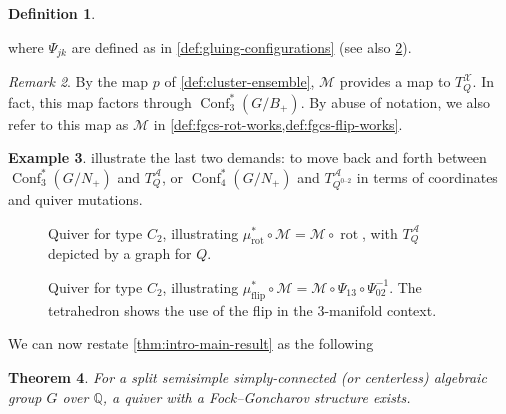 \documentclass{amsart}
\theoremstyle{plain}
\newtheorem{theorem}{Theorem}[section]
\theoremstyle{definition}
\newtheorem{definition}[theorem]{Definition}
\newtheorem{example}[theorem]{Example}
\theoremstyle{remark}
\newtheorem{remark}[theorem]{Remark}
\newcommand{\Qdv}{Q^{0\text{--}2}}
\newcommand{\conftoquiv}{\mathcal{M}}
\newcommand{\muflipind}{{\mu_{\text{flip}}^{\ast}}}
\newcommand{\murotind}{{\mu_{\text{rot}}^{\ast}}}
\newcommand{\seedAtorus}{T^{\mathcal{A}}}
\newcommand{\seedXtorus}{T^{\mathcal{X}}}
\DeclareMathOperator{\Conf}{Conf}
\begin{document}
\begin{definition}
\begin{enumerate}
{      } where $\Psi_{jk}$ are defined as in
      \cref{def:gluing-configurations} (see also
      \cref{fig:QC2-and-flip}).
    \end{enumerate}
  \end{definition}

  \begin{remark}
    By the map $p$ of \cref{def:cluster-ensemble}, $\conftoquiv$
    provides a map to $\seedXtorus_Q$. In fact, this map factors through
    $\Conf_3^{\ast}(G/B_{+})$. By abuse of notation, we also refer to
    this map as $\conftoquiv$ in
    \cref{def:fgcs-rot-works,def:fgcs-flip-works}.
  \end{remark}

  \begin{example}
     illustrate the last two
    demands: to move back and forth between $\Conf_{3}^{\ast}(G/N_{+})$
    and $\seedAtorus_{Q}$, or $\Conf_{4}^{\ast}(G/N_{+})$ and
    $\seedAtorus_{\Qdv}$ in terms of coordinates and quiver mutations.
  \end{example}

  \begin{figure}[h]
    \centering 

    \caption{Quiver for type $C_2$, illustrating $\murotind \circ
      \conftoquiv = \conftoquiv \circ \operatorname{rot}$, with
      $\seedAtorus_Q$ depicted by a graph for $Q$.
      \label{fig:QC2-and-rot}
    }
  \end{figure}

  \begin{figure}[h]
    \centering 

    \caption{Quiver for type $C_2$, illustrating $\muflipind \circ
      \conftoquiv = \conftoquiv \circ \Psi_{13} \circ \Psi_{02}^{-1}$.
      The tetrahedron shows the use of the flip in the $3$-manifold
      context.
      \label{fig:QC2-and-flip}
    }
  \end{figure}

  We can now restate \cref{thm:intro-main-result} as the following

  \begin{theorem}
    \label{thm:fgcs-exists}
    For a split semisimple simply-connected (or centerless) algebraic
    group $G$ over $\mathbb{Q}$, a quiver with a Fock--Goncharov
    structure exists.
  \end{theorem}
\end{document}
